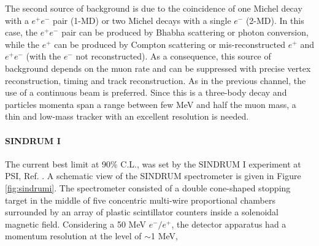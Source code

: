 
The second source of background is due to the coincidence of one Michel decay with a $e^+e^-$ pair (1-MD) or two Michel decays with a single $e^-$ (2-MD). 
In this case, the $e^+e^-$ pair can be produced by Bhabha scattering or photon conversion, while the $e^+$
can be produced by Compton scattering or mis-reconstructed $e^+$ and $e^+e^-$ (with the $e^-$ not reconstructed). 
As a consequence, this source of background depends on the muon rate and
can be suppressed with precise vertex reconstruction, timing and track reconstruction.
As in the previous channel, the use of a continuous beam is preferred.
Since this is a three-body decay and particles momenta span {\violet a range between few MeV }
and half the muon mass, a thin and low-mass tracker with an excellent resolution is needed.


\paragraph{SINDRUM I}
The current best limit   at 90\% C.L., was set by the
SINDRUM I experiment at PSI, Ref. \cite{sindrumi}. A schematic view of the SINDRUM spectrometer is given in Figure \ref{fig:sindrumi}. 
The spectrometer consisted of a double cone-shaped stopping target in the middle of five concentric multi-wire proportional chambers surrounded by an array of plastic
scintillator counters inside a solenoidal magnetic field. Considering a 50 MeV $e^-/e^+$, the detector 
apparatus had a {\violet momentum resolution at the level of $\sim$1 MeV,}



